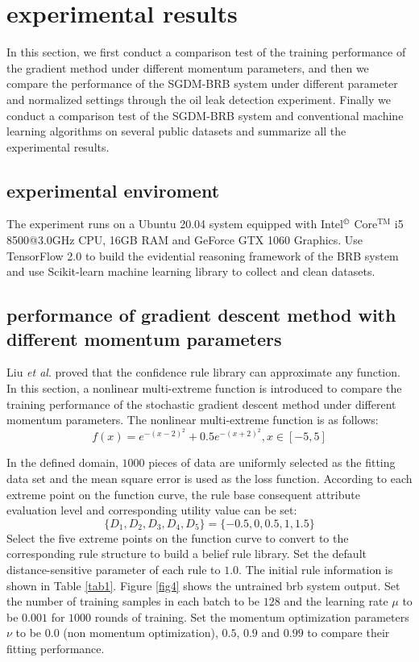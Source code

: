 \documentclass{ieeeaccess}
\begin{document}
\section{experimental results}
In this section, we first conduct a comparison test of the training performance of the gradient method under different momentum parameters,
and then we compare the performance of the SGDM-BRB system under different parameter and normalized settings through the oil leak detection experiment.
Finally we conduct a comparison test of the SGDM-BRB system and conventional machine learning algorithms on several public datasets and summarize all the experimental results.

\subsection{experimental enviroment}
The experiment runs on a Ubuntu 20.04 system equipped with Intel$^{\copyright}$ Core$^{\text{TM}}$ i5 8500@3.0GHz CPU, 16GB RAM and GeForce GTX 1060 Graphics.
Use TensorFlow 2.0 to build the evidential reasoning framework of the BRB system and use Scikit-learn machine learning library to collect and clean datasets.

\subsection{performance of gradient descent method with different momentum parameters}
Liu \textit{et al}.\cite{a16} proved that the confidence rule library can approximate any function.
In this section, a nonlinear multi-extreme function is introduced to compare the training performance of the stochastic gradient descent method under different momentum parameters.
The nonlinear multi-extreme function is as follows:
\begin{equation}
    f(x)=e^{-(x-2)^2}+0.5e^{-(x+2)^2},x\in[-5,5]
\end{equation}

In the defined domain, $1000$ pieces of data are uniformly selected as the fitting data set and the mean square error is used as the loss function.
According to each extreme point on the function curve, the rule base consequent attribute evaluation level and corresponding utility value can be set:
$$\{D_1,D_2,D_3,D_4,D_5\}=\{-0.5,0,0.5,1,1.5\}$$
Select the five extreme points on the function curve to convert to the corresponding rule structure to build a belief rule library.
Set the default distance-sensitive parameter of each rule to $1.0$.
The initial rule information is shown in Table \ref{tab1}. Figure \ref{fig4} shows the untrained brb system output.
Set the number of training samples in each batch to be $128$ and the learning rate $\mu$ to be $0.001$ for $1000$ rounds of training.
Set the momentum optimization parameters $\nu$ to be 0.0 (non momentum optimization), $0.5$, $0.9$ and $0.99$ to compare their fitting performance.
\end{document}

